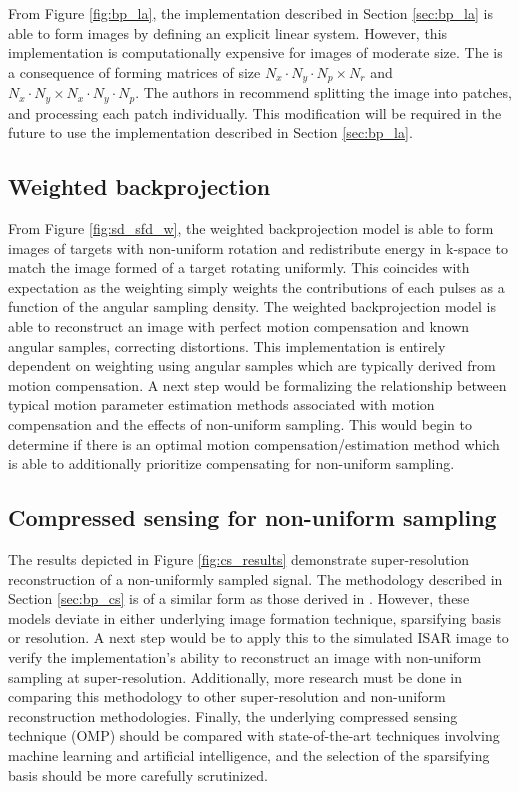 \documentclass[conference]{IEEEtran}
\begin{document}
From Figure \ref{fig:bp_la}, the implementation described in Section \ref{sec:bp_la} is able to form images by defining an explicit linear system. However, this implementation is computationally expensive for images of moderate size. The is a consequence of forming matrices of size $N_{x} \cdot N_{y} \cdot N_{p} \times N_{r}$ and $N_{x} \cdot N_{y} \times N_{x} \cdot N_{y} \cdot N_{p}$. The authors in \cite{Focsa_2021} recommend splitting the image into patches, and processing each patch individually. This modification will be required in the future to use the implementation described in Section \ref{sec:bp_la}.

\subsection{Weighted backprojection}

From Figure \ref{fig:sd_sfd_w}, the weighted backprojection model is able to form images of targets with non-uniform rotation and redistribute energy in k-space to match the image formed of a target rotating uniformly. This coincides with expectation as the weighting simply weights the contributions of each pulses as a function of the angular sampling density. The weighted backprojection model is able to reconstruct an image with perfect motion compensation and known angular samples, correcting distortions. This implementation is entirely dependent on weighting using angular samples which are typically derived from motion compensation. A next step would be formalizing the relationship between typical motion parameter estimation methods associated with motion compensation and the effects of non-uniform sampling. This would begin to determine if there is an optimal motion compensation/estimation method which is able to additionally prioritize compensating for non-uniform sampling.

\subsection{Compressed sensing for non-uniform sampling}

The results depicted in Figure \ref{fig:cs_results} demonstrate super-resolution reconstruction of a non-uniformly sampled signal. The methodology described in Section \ref{sec:bp_cs} is of a similar form as those derived in \cite{Liu_2012, Sun_2015, Zhang_2023}. However, these models deviate in either underlying image formation technique, sparsifying basis or resolution. A next step would be to apply this to the simulated ISAR image to verify the implementation's ability to reconstruct an image with non-uniform sampling at super-resolution. Additionally, more research must be done in comparing this methodology to other super-resolution and non-uniform reconstruction methodologies. Finally, the underlying compressed sensing technique (OMP) should be compared with state-of-the-art techniques involving machine learning and artificial intelligence, and the selection of the sparsifying basis should be more carefully scrutinized.  
\end{document}
